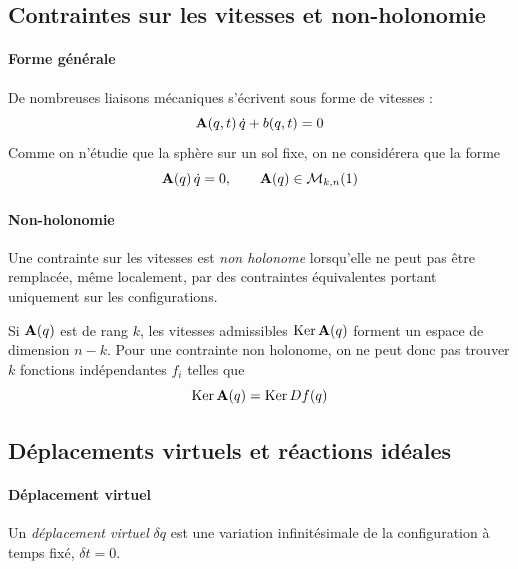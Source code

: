 \subsection{Contraintes sur les vitesses et non-holonomie}

\paragraph{Forme générale}

De nombreuses liaisons mécaniques s'écrivent sous forme de vitesses :
\[
    \mathbf{A}(q,t)\,\dot q + b(q,t) = 0
\]
Comme on n'étudie que la sphère sur un sol fixe, on ne considérera
que la forme
\[
    \mathbf{A}(q)\,\dot q = 0,
    \qquad \mathbf{A}(q)\in\mathcal{M}_{k,n}(1)
\]

\paragraph{Non-holonomie}

\begin{definition}
    Une contrainte sur les vitesses est \emph{non holonome} lorsqu'elle
    ne peut pas être remplacée, même localement, par des contraintes
    équivalentes portant uniquement sur les configurations.
\end{definition}

Si $\mathbf{A}(q)$ est de rang $k$, les vitesses admissibles
$\operatorname{Ker}\mathbf{A}(q)$ forment un espace de dimension $n - k$. Pour une
contrainte non holonome, on ne peut donc pas trouver $k$ fonctions
indépendantes $f_i$ telles que
\[
    \operatorname{Ker}\mathbf{A}(q) = \operatorname{Ker} D f(q)
\]

\subsection{Déplacements virtuels et réactions idéales}

\paragraph{Déplacement virtuel}

\begin{definition}
    Un \emph{déplacement virtuel} $\delta q$ est une variation
    infinitésimale de la configuration à temps fixé, $\delta t = 0$.
\end{definition}

